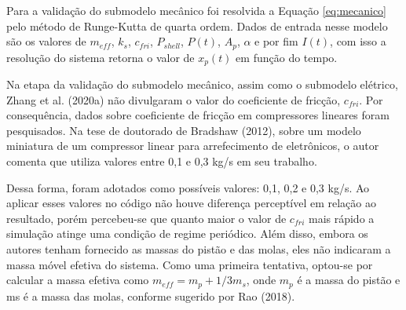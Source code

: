 Para a validação do submodelo mecânico foi resolvida a Equação \ref{eq:mecanico} pelo método de Runge-Kutta de quarta ordem. Dados de entrada nesse modelo são os valores de $m_{eff}$, $k_s$, $c_{fri}$, $P_{shell}$, $P(t)$, $A_p$, $\alpha$ e por fim $I(t)$, com isso a resolução do sistema retorna o valor de $x_p(t)$ em função do tempo.

Na etapa da validação do submodelo mecânico, assim como o submodelo elétrico,  Zhang et al. (2020a) não divulgaram o valor do coeficiente de fricção, $c_{fri}$. Por consequência, dados sobre coeficiente de fricção em compressores lineares foram pesquisados. Na tese de doutorado de Bradshaw (2012), sobre um modelo miniatura de um compressor linear para arrefecimento de eletrônicos, o autor comenta que utiliza valores entre 0,1 e 0,3 kg/s em seu trabalho.

Dessa forma, foram adotados como possíveis valores: 0,1, 0,2 e 0,3 kg/s. Ao aplicar esses valores no código não houve diferença perceptível em relação ao resultado, porém percebeu-se que quanto maior o valor de $c_{fri}$ mais rápido a simulação atinge uma condição de regime periódico. Além disso, embora os autores tenham fornecido as massas do pistão e das molas, eles não indicaram a massa móvel efetiva do sistema. Como uma primeira tentativa, optou-se por calcular a massa efetiva como $m_{eff}=m_p+1/3m_s$, onde $m_p$ é a massa do pistão e ms é a massa das molas, conforme sugerido por Rao (2018). %



 
